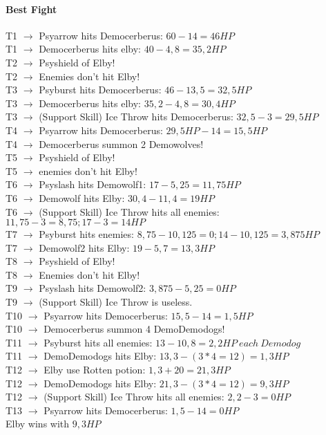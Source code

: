 \paragraph*{Best Fight\\}
T1 $\rightarrow$ Psyarrow hits Democerberus: $60 - 14 = 46 HP$\\
T1 $\rightarrow$ Democerberus hits elby: $40 - 4,8 = 35,2 HP$\\
T2 $\rightarrow$ Psyshield of Elby!\\
T2 $\rightarrow$ Enemies don’t hit Elby!\\
T3 $\rightarrow$ Psyburst hits Democerberus: $46 - 13,5 = 32,5 HP$\\
T3 $\rightarrow$ Democerberus hits elby: $35,2 - 4,8 = 30,4 HP$\\
T3 $\rightarrow$ (Support Skill) Ice Throw hits Democerberus: $32,5 - 3 = 29,5 HP$\\
T4 $\rightarrow$ Psyarrow hits Democerberus: $29,5 HP - 14 = 15,5 HP$\\
T4 $\rightarrow$ Democerberus summon 2 Demowolves!\\
T5 $\rightarrow$ Psyshield of Elby!\\
T5 $\rightarrow$ enemies don’t hit Elby!\\
T6 $\rightarrow$ Psyslash hits Demowolf1: $17 - 5,25 = 11,75 HP$\\
T6 $\rightarrow$ Demowolf hits Elby: $30,4 - 11,4 = 19 HP$\\
T6 $\rightarrow$ (Support Skill) Ice Throw hits all enemies: $11,75 - 3 = 8,75; 17 - 3 = 14 HP$\\
T7 $\rightarrow$ Psyburst hits enemies: $8,75 - 10,125 = 0; 14 - 10,125 = 3,875 HP$\\
T7 $\rightarrow$ Demowolf2 hits Elby: $19 - 5,7  = 13,3 HP$\\
T8 $\rightarrow$ Psyshield of Elby!\\
T8 $\rightarrow$ Enemies don’t hit Elby!\\
T9 $\rightarrow$ Psyslash hits Demowolf2: $3,875 - 5,25 = 0 HP$\\
T9 $\rightarrow$ (Support Skill) Ice Throw is useless.\\
T10 $\rightarrow$ Psyarrow hits Democerberus: $15,5 - 14 = 1,5 HP$\\
T10 $\rightarrow$ Democerberus summon 4 DemoDemodogs!\\
T11 $\rightarrow$ Psyburst hits all enemies: $13 - 10,8 = 2,2 HP\:each\:Demodog$\\
T11 $\rightarrow$ DemoDemodogs hits Elby: $13,3 - (3*4 = 12) = 1,3 HP$\\
T12 $\rightarrow$ Elby use Rotten potion: $1,3 + 20 = 21,3 HP$\\
T12 $\rightarrow$ DemoDemodogs hits Elby: $21,3 - (3*4 = 12) = 9,3 HP$\\
T12 $\rightarrow$ (Support Skill) Ice Throw hits all enemies: $2,2 - 3 = 0 HP$\\
T13 $\rightarrow$ Psyarrow hits Democerberus: $1,5 - 14 = 0 HP$\\
Elby wins with $9,3 HP$\\


